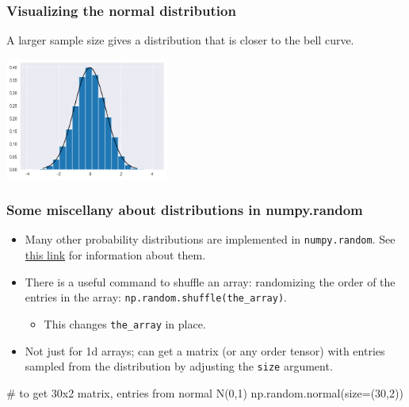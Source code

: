 \documentclass{beamer}
\newenvironment{codeblock}
    {\hfill\begin{beamerboxesrounded}[lower=codecol, width=0.8\textwidth]
    \medskip

    }
    { 
    \end{beamerboxesrounded}\hfill
    }
\theoremstyle{example}
\newcommand{\ct}[1]{\lstinline[language=Python]!#1!}
\newcommand{\ttt}[1]{{\small\texttt{#1}}}
\begin{document}

\begin{frame}[fragile]
\frametitle{Visualizing the normal distribution}
    
A larger sample size gives a distribution that is closer to the bell curve.
    
\centering
\includegraphics[width=0.4\textwidth]{histogram_of_sample4.png}
    
\end{frame}

\begin{frame}[fragile]
\frametitle{Some miscellany about distributions in {\ttm numpy.random}}
\begin{itemize}
    \item Many other probability distributions are implemented in \ttt{numpy.random}. See \href{https://numpy.org/doc/2.1/reference/random/legacy.html#distributions}{this link} for information about them.
    
    \item There is a useful command to shuffle an array: randomizing the order of the entries in the array: \ttt{np.random.shuffle(the}\ct{_}\ttt{array)}.
    \begin{itemize}
        \item This changes \ttt{the}\ct{_}\ttt{array} in place.
    \end{itemize}

    \item Not just for 1d arrays; can get a matrix (or any order tensor) with entries sampled from the distribution by adjusting the \ttt{size} argument.
\end{itemize}

\begin{codeblock}

\begin{python}
# to get 30x2 matrix, entries from normal N(0,1)
np.random.normal(size=(30,2))
\end{python}

\end{codeblock}

\end{frame}
\end{document}
